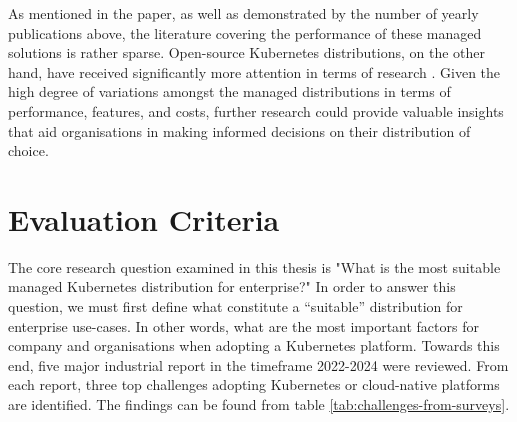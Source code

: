 As mentioned in the paper, as well as demonstrated by the number of yearly publications above, the literature covering the performance of these managed solutions is rather sparse. Open-source Kubernetes distributions, on the other hand, have received significantly more attention in terms of research \cite{bohmProfilingLightweightContainer2021,koziolekLightweightKubernetesDistributions2023,ascensaoAssessingKubernetesDistributions2024,9660392,bryantKubernetesDeploymentOptions2024}. Given the high degree of variations amongst the managed distributions in terms of performance, features, and costs, further research could provide valuable insights that aid organisations in making informed decisions on their distribution of choice.

\chapter{Evaluation Criteria}

The core research question examined in this thesis is "What is the most suitable managed Kubernetes distribution for enterprise?" In order to answer this question, we must first define what constitute a “suitable” distribution for enterprise use-cases. In other words, what are the most important factors for company and organisations when adopting a Kubernetes platform. Towards this end, five major industrial report in the timeframe 2022-2024 were reviewed. From each report, three top challenges adopting Kubernetes or cloud-native platforms are identified. The findings can be found from table \ref{tab:challenges-from-surveys}.


